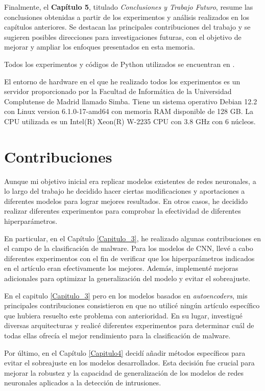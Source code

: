 Finalmente, el \textbf{Capítulo 5}, titulado \textit{Conclusiones y Trabajo Futuro}, resume las conclusiones obtenidas a partir de los experimentos y análisis realizados en los capítulos anteriores. Se destacan las principales contribuciones del trabajo y se sugieren posibles direcciones para investigaciones futuras, con el objetivo de mejorar y ampliar los enfoques presentados en esta memoria.

Todos los experimentos y códigos de Python utilizados se encuentran en \citep{poyatos_repositorio_2024}.

El entorno de hardware en el que he realizado todos los experimentos es un servidor proporcionado por la Facultad de Informática de la Universidad Complutense de Madrid llamado Simba. Tiene un sistema operativo Debian 12.2 con Linux version 6.1.0-17-amd64 con memoria RAM disponible de 128 GB. La CPU utilizada es un Intel(R) Xeon(R) W-2235 CPU con 3.8 GHz con 6 núcleos. 



\section{Contribuciones} \label{sec:1.5contribuciones}

Aunque mi objetivo inicial era replicar modelos existentes de redes neuronales, a lo largo del trabajo he decidido hacer ciertas modificaciones y aportaciones a diferentes modelos para lograr mejores resultados. En otros casos, he decidido realizar diferentes experimentos para comprobar la efectividad de diferentes hiperparámetros. 

En particular, en el Capítulo \ref{Capitulo_3}, he realizado algunas contribuciones en el campo de la clasificación de malware. Para los modelos de CNN, llevé a cabo diferentes experimentos con el fin de verificar que los hiperparámetros indicados en el artículo eran efectivamente los mejores. Además, implementé mejoras adicionales para optimizar la generalización del modelo y evitar el sobreajuste.

En el capitulo \ref{Capitulo_3} pero en los modelos basados en \textit{autoencoders}, mis principales contribuciones consistieron en que no utilicé ningún artículo específico que hubiera resuelto este problema con anterioridad. En su lugar, investigué diversas arquitecturas y realicé diferentes experimentos para determinar cuál de todas ellas ofrecía el mejor rendimiento para la clasificación de malware.

Por último, en el Capítulo \ref{Capitulo4} decidí añadir métodos específicos para evitar el sobreajuste en los modelos desarrollados. Esta decisión fue crucial para mejorar la robustez y la capacidad de generalización de los modelos de redes neuronales aplicados a la detección de intrusiones.





